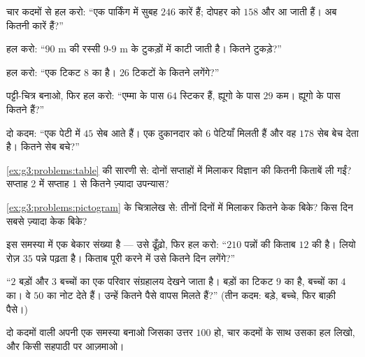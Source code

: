 \begin{exercise}[$\star$]\label{exo:g3:problems:2}
चार कदमों से हल करो: ``एक पार्किंग में सुबह $246$ कारें हैं;
दोपहर को $158$ और आ जाती हैं। अब कितनी कारें हैं?''
\end{exercise}

\begin{exercise}[$\star$]\label{exo:g3:problems:3}
हल करो: ``$90$ m की रस्सी $9$-$9$ m के टुकड़ों में काटी जाती
है। कितने टुकड़े?''
\end{exercise}

\begin{exercise}[$\star$]\label{exo:g3:problems:4}
हल करो: ``एक टिकट $8$ का है। $26$ टिकटों के कितने लगेंगे?''
\end{exercise}

\begin{exercise}[$\star$]\label{exo:g3:problems:5}
पट्टी-चित्र बनाओ, फिर हल करो: ``एम्मा के पास $64$ स्टिकर हैं,
ह्यूगो के पास $29$ कम। ह्यूगो के पास कितने हैं?''
\end{exercise}

\begin{exercise}[$\star$]\label{exo:g3:problems:6}
दो कदम: ``एक पेटी में $45$ सेब आते हैं। एक दुकानदार को $6$
पेटियाँ मिलती हैं और वह $178$ सेब बेच देता है। कितने सेब बचे?''
\end{exercise}

\begin{exercise}[$\star$]\label{exo:g3:problems:7}
\cref{ex:g3:problems:table} की सारणी से: दोनों सप्ताहों में
मिलाकर विज्ञान की कितनी किताबें ली गईं? सप्ताह 2 में सप्ताह 1
से कितने ज़्यादा उपन्यास?
\end{exercise}

\begin{exercise}[$\star$]\label{exo:g3:problems:8}
\cref{ex:g3:problems:pictogram} के चित्रालेख से: तीनों दिनों में
मिलाकर कितने केक बिके? किस दिन सबसे ज़्यादा केक
बिके?
\end{exercise}

\begin{exercise}[$\star$]\label{exo:g3:problems:9}
इस समस्या में एक बेकार संख्या है --- उसे ढूँढ़ो, फिर हल करो:
``$210$ पन्नों की किताब $12$ की है। लियो रोज़ $35$ पन्ने पढ़ता
है। किताब पूरी करने में उसे कितने दिन लगेंगे?''
\end{exercise}

\begin{exercise}[$\star\star$]\label{exo:g3:problems:10}
``$2$ बड़ों और $3$ बच्चों का एक परिवार संग्रहालय देखने जाता है।
बड़ों का टिकट $9$ का है, बच्चों का $4$ का। वे $50$ का नोट देते
हैं। उन्हें कितने पैसे वापस मिलते हैं?'' (तीन कदम: बड़े, बच्चे,
फिर बाक़ी पैसे।)
\end{exercise}

\begin{exercise}[$\star\star$]\label{exo:g3:problems:11}
दो कदमों वाली अपनी एक समस्या बनाओ जिसका उत्तर $100$ हो, चार
कदमों के साथ उसका हल लिखो, और किसी सहपाठी पर आज़माओ।
\end{exercise}
